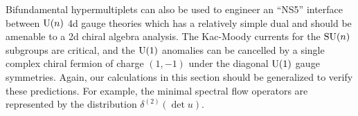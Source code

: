 \documentclass[11pt,a4paper]{article}
\begin{document}
Bifundamental hypermultiplets can also be used to engineer an ``NS5'' interface between ${\mathrm U}(n)$ 4d gauge theories which has a relatively simple dual and should be amenable to a 2d chiral algebra analysis. The Kac-Moody currents for the ${\mathrm{SU}}(n)$ subgroups are critical, and the ${\mathrm U}(1)$ anomalies can be cancelled by a single complex chiral fermion of charge $(1,-1)$ under the diagonal ${\mathrm U}(1)$ gauge symmetries. 
Again, our calculations in this section should be generalized to verify these predictions. For example, the minimal spectral flow operators 
are represented by the distribution $\delta^{(2)}(\det u)$. 
%
% 
%
\end{document}
